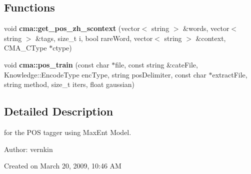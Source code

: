 \subsection*{Functions}
\begin{CompactItemize}
\item 
void {\bf cma::get\_\-pos\_\-zh\_\-scontext} (vector$<$ string $>$ \&words, vector$<$ string $>$ \&tags, size\_\-t i, bool rareWord, vector$<$ string $>$ \&context, CMA\_\-CType $\ast$ctype)
\item 
void {\bf cma::pos\_\-train} (const char $\ast$file, const string \&cateFile, Knowledge::EncodeType encType, string posDelimiter, const char $\ast$extractFile, string method, size\_\-t iters, float gaussian)
\end{CompactItemize}


\subsection{Detailed Description}
for the POS tagger using MaxEnt Model. 

\begin{Desc}
\item[Author:]vernkin\end{Desc}
Created on March 20, 2009, 10:46 AM 